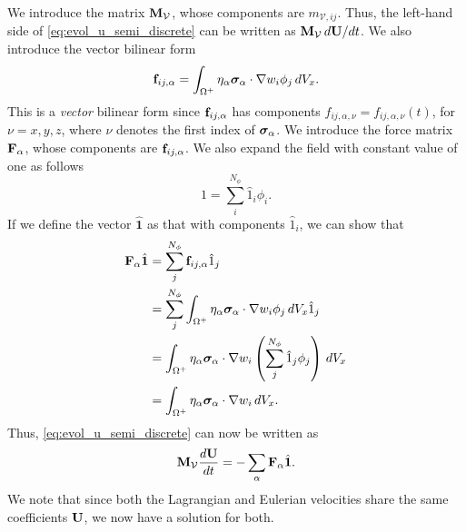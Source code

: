 \documentclass[11pt]{report}
\begin{document}
We introduce the matrix $\mathbf{M}_\mathcal{V}$, whose components are $m_{\mathcal{V},ij}$. Thus, the left-hand side of \cref{eq:evol_u_semi_discrete} can be written as $\mathbf{M}_\mathcal{V} \, d\mathbf{U} / dt$.
We also introduce the vector bilinear form
\begin{equation}
    \mathbf{f}_{ij,\alpha} = \int_{\Omega^+} \eta_\alpha \bm \sigma_\alpha \cdot \nabla w_i \phi_j \, dV_x.
\end{equation}
This is a \textit{vector} bilinear form since $\mathbf{f}_{ij,\alpha}$ has components $f_{ij,\alpha,\nu} = f_{ij,\alpha,\nu}(t)$, for $\nu = x,y,z$, where $\nu$ denotes the first index of $\bm \sigma_\alpha$. We introduce the force matrix $\mathbf{F}_\alpha$, whose components are $\mathbf{f}_{ij,\alpha}$. We also expand the field with constant value of one as follows
\begin{equation*}
    1 = \sum_i^{N_\phi} \hat{1}_i \phi_i.
\end{equation*}
If we define the vector $\hat{\mathbf{1}}$ as that with components $\hat{1}_i$, we can show that 
\begin{align*}
    \mathbf{F}_\alpha \hat{\mathbf{1}} &= \sum_j^{N_\phi} \mathbf{f}_{ij,\alpha} \hat{1}_j \nonumber \\
    &= \sum_j^{N_\phi} \int_{\Omega^+} \eta_\alpha \bm \sigma_\alpha \cdot \nabla w_i \phi_j \, dV_x \hat{1}_j \nonumber \\
    &= \int_{\Omega^+} \eta_\alpha \bm \sigma_\alpha \cdot \nabla w_i \left ( \sum_j^{N_\phi} \hat{1}_j \phi_j \right ) \, dV_x \nonumber \\
    &= \int_{\Omega^+} \eta_\alpha \bm \sigma_\alpha \cdot \nabla w_i \, dV_x.
\end{align*}
Thus, \cref{eq:evol_u_semi_discrete} can now be written as
\begin{equation}
    \label{eq:evol_vel_semi_discrete}
    \mathbf{M}_\mathcal{V} \frac{d\mathbf{U}}{dt} = -\sum_\alpha \mathbf{F}_\alpha \hat{\mathbf{1}}.
\end{equation}
We note that since both the Lagrangian and Eulerian velocities share the same coefficients $\mathbf{U}$, we now have a solution for both.

\end{document}
